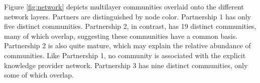 \documentclass[final]{beamer}
\begin{document}
\begin{frame}[t]
\begin{multicols}{3}
Figure \ref{fig:network} depicts multilayer communities overlaid onto the different network layers. Partners are distinguished by node color. Partnership 1 has only five distinct communities. Partnership 2, in contrast, has 19 distinct communities, many of which overlap, suggesting these communities have a common basis. Partnership 2 is also quite mature, which may explain the relative abundance of communities. Like Partnership 1, no community is associated with the explicit knowledge provider network. Partnership 3 has nine distinct communities, only some of which overlap.\\~\ 


\end{multicols}
\end{frame}
\end{document}
